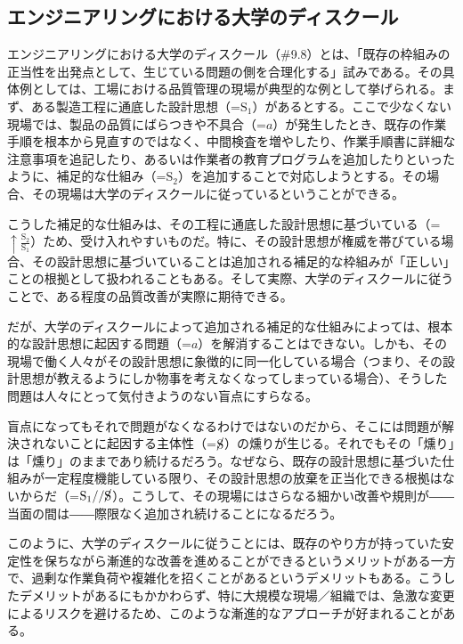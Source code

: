 \subsection{エンジニアリングにおける大学のディスクール}\label{ux30a8ux30f3ux30b8ux30cbux30a2ux30eaux30f3ux30b0ux306bux304aux3051ux308bux5927ux5b66ux306eux30c7ux30a3ux30b9ux30afux30fcux30eb}

エンジニアリングにおける大学のディスクール（\#9.8）とは、「既存の枠組みの正当性を出発点として、生じている問題の側を合理化する」試みである。その具体例としては、工場における品質管理の現場が典型的な例として挙げられる。まず、ある製造工程に通底した設計思想（=\(\textrm{S}_1\)）があるとする。ここで少なくない現場では、製品の品質にばらつきや不具合（=\(a\)）が発生したとき、既存の作業手順を根本から見直すのではなく、中間検査を増やしたり、作業手順書に詳細な注意事項を追記したり、あるいは作業者の教育プログラムを追加したりといったように、補足的な仕組み（=\(\textrm{S}_2\)）を追加することで対応しようとする。その場合、その現場は大学のディスクールに従っているということができる。

こうした補足的な仕組みは、その工程に通底した設計思想に基づいている（=\(\uparrow\frac{\textrm{S}_2}{\textrm{S}_1}\)）ため、受け入れやすいものだ。特に、その設計思想が権威を帯びている場合、その設計思想に基づいていることは追加される補足的な枠組みが「正しい」ことの根拠として扱われることもある。そして実際、大学のディスクールに従うことで、ある程度の品質改善が実際に期待できる。

だが、大学のディスクールによって追加される補足的な仕組みによっては、根本的な設計思想に起因する問題（=\(a\)）を解消することはできない。しかも、その現場で働く人々がその設計思想に象徴的に同一化している場合（つまり、その設計思想が教えるようにしか物事を考えなくなってしまっている場合）、そうした問題は人々にとって気付きようのない盲点にすらなる。

盲点になってもそれで問題がなくなるわけではないのだから、そこには問題が解決されないことに起因する主体性（=\(\cancel{\textrm{S}}\)）の燻りが生じる。それでもその「燻り」は「燻り」のままであり続けるだろう。なぜなら、既存の設計思想に基づいた仕組みが一定程度機能している限り、その設計思想の放棄を正当化できる根拠はないからだ（=\(\textrm{S}_1//\cancel{\textrm{S}}\)）。こうして、その現場にはさらなる細かい改善や規則が――当面の間は――際限なく追加され続けることになるだろう。

このように、大学のディスクールに従うことには、既存のやり方が持っていた安定性を保ちながら漸進的な改善を進めることができるというメリットがある一方で、過剰な作業負荷や複雑化を招くことがあるというデメリットもある。こうしたデメリットがあるにもかかわらず、特に大規模な現場／組織では、急激な変更によるリスクを避けるため、このような漸進的なアプローチが好まれることがある。

